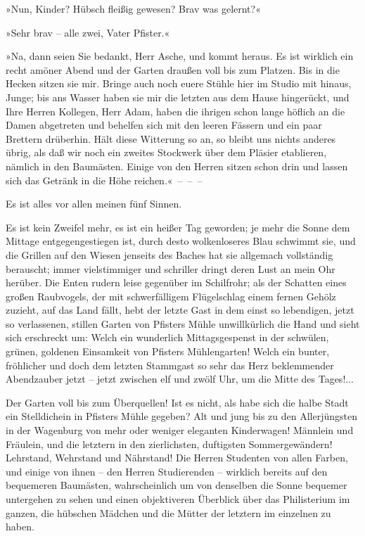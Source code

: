 »Nun, Kinder? Hübsch fleißig gewesen? Brav was gelernt?«

»Sehr brav – alle zwei, Vater Pfister.«

»Na, dann seien Sie bedankt, Herr Asche, und kommt heraus. Es ist
wirklich ein recht amöner Abend und der Garten draußen voll bis zum
Platzen. Bis in die Hecken sitzen sie mir. Bringe auch noch euere
Stühle hier im Studio mit hinaus, Junge; bis ans Wasser haben sie
mir die letzten aus dem Hause hingerückt, und Ihre Herren Kollegen,
Herr Adam, haben die ihrigen schon lange höflich an die Damen
abgetreten und behelfen sich mit den leeren Fässern und ein paar
Brettern drüberhin. Hält diese Witterung so an, so bleibt uns
nichts anderes übrig, als daß wir noch ein zweites Stockwerk über
dem Pläsier etablieren, nämlich in den Baumästen. Einige von den
Herren sitzen schon drin und lassen sich das Getränk in die Höhe
reichen.«~–~–~–

Es ist alles vor allen meinen fünf Sinnen.

Es ist kein Zweifel mehr, es ist ein heißer Tag geworden; je mehr
die Sonne dem Mittage entgegengestiegen ist, durch desto
wolkenloseres Blau schwimmt sie, und die Grillen auf den Wiesen
jenseits des Baches hat sie allgemach vollständig berauscht; immer
vielstimmiger und schriller dringt deren Lust an mein Ohr herüber.
Die Enten rudern leise gegenüber im Schilfrohr; als der Schatten
eines großen Raubvogels, der mit schwerfälligem Flügelschlag einem
fernen Gehölz zuzieht, auf das Land fällt, hebt der letzte Gast in
dem einst so lebendigen, jetzt so verlassenen, stillen Garten von
Pfisters Mühle unwillkürlich die Hand und sieht sich erschreckt um:
Welch ein wunderlich Mittagsgespenst in der schwülen, grünen,
goldenen Einsamkeit von Pfisters Mühlengarten! Welch ein bunter,
fröhlicher und doch dem letzten Stammgast so sehr das Herz
beklemmender Abendzauber jetzt – jetzt zwischen elf und zwölf Uhr,
um die Mitte des Tages!...

Der Garten voll bis zum Überquellen! Ist es nicht, als habe sich
die halbe Stadt ein Stelldichein in Pfisters Mühle gegeben? Alt und
jung bis zu den Allerjüngsten in der Wagenburg von mehr oder
weniger eleganten Kinderwagen! Männlein und Fräulein, und die
letztern in den zierlichsten, duftigsten Sommergewändern!
Lehrstand, Wehrstand und Nährstand! Die Herren Studenten von allen
Farben, und einige von ihnen – den Herren Studierenden – wirklich
bereits auf den bequemeren Baumästen, wahrscheinlich um von
denselben die Sonne bequemer untergehen zu sehen und einen
objektiveren Überblick über das Philisterium im ganzen, die
hübschen Mädchen und die Mütter der letztern im einzelnen zu
haben.

